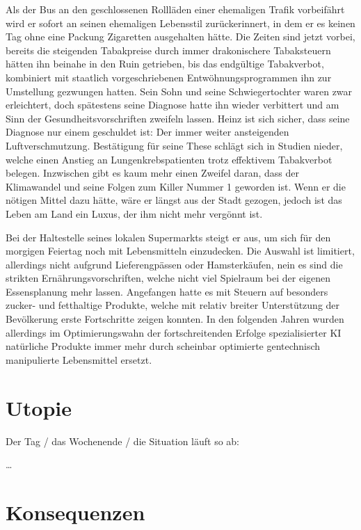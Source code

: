 \documentclass[twoside, a4paper, DIV=11, open=any, bibliography=totoc]{scrbook}
\begin{document}
Als der Bus an den geschlossenen Rollläden einer ehemaligen Trafik vorbeifährt wird
er sofort an seinen ehemaligen Lebensstil zurückerinnert, in dem er es keinen Tag ohne eine Packung Zigaretten ausgehalten hätte.
Die Zeiten sind jetzt vorbei, bereits die steigenden Tabakpreise durch immer drakonischere Tabaksteuern hätten ihn beinahe
in den Ruin getrieben, bis das endgültige Tabakverbot, kombiniert mit staatlich vorgeschriebenen Entwöhnungsprogrammen ihn
zur Umstellung gezwungen hatten. Sein Sohn und seine Schwiegertochter waren zwar erleichtert, doch
spätestens seine Diagnose hatte ihn wieder verbittert und am Sinn der Gesundheitsvorschriften zweifeln lassen.
Heinz ist sich sicher, dass seine Diagnose nur einem geschuldet ist: Der immer weiter ansteigenden Luftverschmutzung.
Bestätigung für seine These schlägt sich in Studien nieder, welche einen Anstieg an Lungenkrebspatienten trotz
effektivem Tabakverbot belegen. Inzwischen gibt es kaum mehr einen Zweifel daran, dass der Klimawandel und seine Folgen zum Killer Nummer 1 geworden ist.
Wenn er die nötigen Mittel dazu hätte, wäre er längst aus der Stadt gezogen, jedoch ist das Leben am Land ein Luxus, der ihm nicht mehr vergönnt ist.

Bei der Haltestelle seines lokalen Supermarkts steigt er aus, um sich für den morgigen Feiertag noch mit Lebensmitteln einzudecken.
Die Auswahl ist limitiert, allerdings nicht aufgrund Lieferengpässen oder Hamsterkäufen, nein es sind die strikten Ernährungsvorschriften,
welche nicht viel Spielraum bei der eigenen Essensplanung mehr lassen. Angefangen hatte es mit Steuern auf besonders zucker- und fetthaltige Produkte,
welche mit relativ breiter Unterstützung der Bevölkerung erste Fortschritte zeigen konnten.
In den folgenden Jahren wurden allerdings im Optimierungswahn der fortschreitenden Erfolge spezialisierter KI
natürliche Produkte immer mehr durch scheinbar optimierte gentechnisch manipulierte Lebensmittel ersetzt.


\section{Utopie} \label{sec:szenutopie}

Der Tag / das Wochenende / die Situation läuft so ab:

\ldots

\section{Konsequenzen} \label{sec:szenkonsequenzen}
\end{document}
